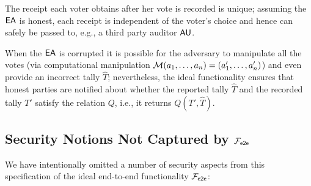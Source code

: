 \begin{claim}
  The receipt each voter obtains after her vote is recorded is unique;
  assuming the $\mathsf{EA}$ is honest, each receipt is independent of the
  voter's choice and hence can safely be passed to, e.g., a third
  party auditor $\mathsf{AU}$.
\end{claim}

\begin{claim}
  When the $\mathsf{EA}$ is corrupted it is possible for the adversary to
  manipulate all the votes (via computational manipulation
  $\mathcal{M}(a_1,\ldots, a_n) = (a_1', \ldots, a'_n)$) and even provide
  an incorrect tally $\hat{T}$; nevertheless, the ideal functionality
  ensures that honest parties are notified about whether the reported
  tally $\hat{T}$ and the recorded tally $T'$ satisfy the relation
  $Q$, i.e., it returns $Q(T',\hat{T})$.
\end{claim}

\subsection{Security Notions Not Captured by $\mathcal{F}_{\mathsf{e2e}}$}

We have intentionally omitted a number of security aspects from this
specification of the ideal end-to-end functionality $\mathcal{F}_{\mathsf{e2e}}$:

